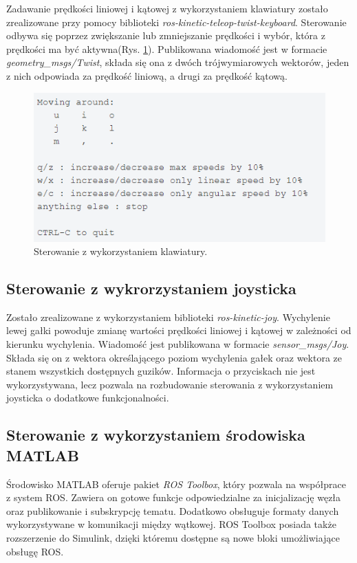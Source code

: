 Zadawanie prędkości liniowej i kątowej z wykorzystaniem klawiatury zostało zrealizowane przy pomocy biblioteki \textit{ros-kinetic-teleop-twist-keyboard}. Sterowanie odbywa się poprzez zwiększanie lub zmniejszanie prędkości i wybór, która z prędkości ma być aktywna(Rys. \ref{fig:klawiatura}). Publikowana wiadomość jest w formacie \textit{geometry\_msgs/Twist}, składa się ona z dwóch trójwymiarowych wektorów, jeden z nich odpowiada za prędkość liniową, a drugi za prędkość kątową.

\begin{figure}[ht]
	\centering
	\includegraphics[scale=0.8]{keyboard.png}
	\caption{Sterowanie z wykorzystaniem klawiatury.}
	\label{fig:klawiatura}
\end{figure}

\subsection{Sterowanie z wykrorzystaniem joysticka}
Zostało zrealizowane z wykorzystaniem biblioteki \textit{ros-kinetic-joy}. Wychylenie lewej gałki powoduje zmianę wartości prędkości liniowej i kątowej w zależności od kierunku wychylenia. Wiadomość jest publikowana w formacie \textit{sensor\_msgs/Joy}. Składa się on z wektora określającego poziom wychylenia gałek oraz wektora ze stanem wszystkich dostępnych guzików. Informacja o przyciskach nie jest wykorzystywana, lecz pozwala na rozbudowanie sterowania z wykorzystaniem joysticka o dodatkowe funkcjonalności. 

\subsection{Sterowanie z wykorzystaniem środowiska MATLAB}

Środowisko MATLAB oferuje pakiet \textit{ROS Toolbox}, który pozwala na współprace z system ROS. Zawiera on gotowe funkcje odpowiedzialne za inicjalizację węzła oraz publikowanie i subskrypcję tematu. Dodatkowo obsługuje formaty danych wykorzystywane w komunikacji między wątkowej.  ROS Toolbox posiada także rozszerzenie do Simulink, dzięki któremu dostępne są nowe bloki umożliwiające obsługę ROS.

